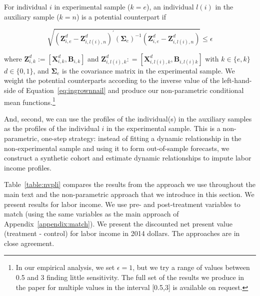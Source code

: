 \begin{algorithm} \label{alg:match2}
For individual $i$ in experimental sample ($k=e$), an individual $l(i)$ in the auxiliary sample ($k=n$) is a potential counterpart if

\begin{equation}\label{eq:ingrownnail}
\sqrt{(\bm{Z}_{i,e}^d - \bm{Z}_{i,l(i),n}^d)^\prime (\bm{\Sigma}_e)^{-1} (\bm{Z}_{i,e}^d - \bm{Z}_{i,l(i),n}^d)} \leq \epsilon
\end{equation}

\noindent where $\bm{Z}_{i,k}^d:= \left[ \bm{X}_{i,k}^d , \bm{B}_{i,k} \right]$ and $\bm{Z}_{i,l(i),k}^d: =  \left[ \bm{X}_{i,l(i), k}^d , \bm{B}_{i,l(i)k} \right]$ with $k \in \{e, k \}$ $d \in \{0, 1 \}$, and $\bm{\Sigma}_e$ is the covariance matrix in the experimental sample. We weight the potential counterparts according to the inverse value of the left-hand-side of Equation~\eqref{eq:ingrownnail} and produce our non-parametric conditional mean functions.\footnote{In our empirical analysis, we set $\epsilon = 1$, but we try a range of values between 0.5 and 3 finding little sensitivity. The full set of the results we produce in the paper for multiple values in the interval [0.5,3] is available on request.}
\end{algorithm}
\doublespacing

\noindent And, second, we can use the profiles of the individual(s) in the auxiliary samples as the profiles of the individual $i$ in the experimental sample. This is a non-parametric, one-step strategy: instead of fitting a dynamic relationship in the non-experimental sample and using it to form out-of-sample forecasts, we construct a synthetic cohort and estimate dynamic relationships to impute labor income profiles.

\noindent Table~\ref{table:nvpli} compares the results from the approach we use throughout the main text and the non-parametric approach that we introduce in this section. We present results for labor income. We use pre- and post-treatment variables to match (using the same variables as the main approach of Appendix~\ref{appendix:match}). We present the discounted net present value (treatment - control) for labor income in 2014 dollars. The approaches are in close agreement.\\

